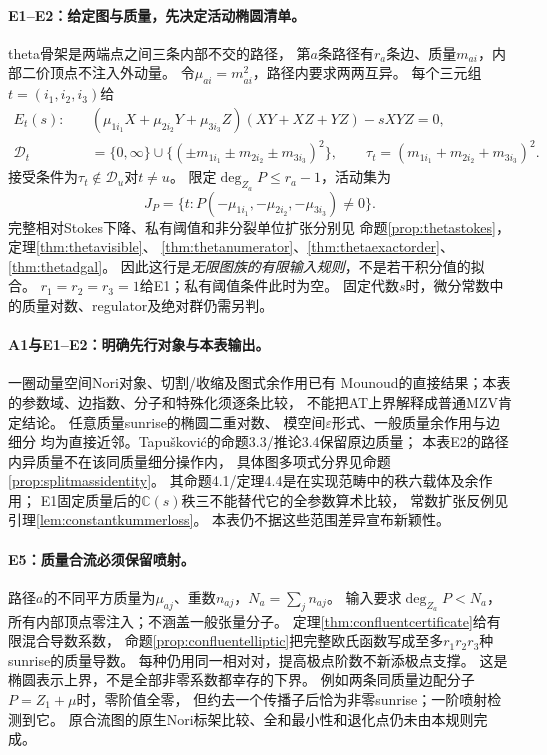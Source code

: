 \documentclass[11pt,a4paper]{ctexart}
\theoremstyle{cnplain}\newtheorem{theorem}{定理}[section]
\theoremstyle{definition}\newtheorem{definition}[theorem]{定义}
\theoremstyle{remark}\newtheorem{remark}[theorem]{注}
\begin{document}
\paragraph{E1--E2：给定图与质量，先决定活动椭圆清单。}
theta骨架是两端点之间三条内部不交的路径，
第$a$条路径有$r_a$条边、质量$m_{ai}$，内部二价顶点不注入外动量。
令$\mu_{ai}=m_{ai}^2$，路径内要求两两互异。
每个三元组$t=(i_1,i_2,i_3)$给
\begin{align*}
 E_t(s):\quad &(\mu_{1i_1}X+\mu_{2i_2}Y+\mu_{3i_3}Z)
                         (XY+XZ+YZ)-sXYZ=0,\\
 \mathcal D_t&=\{0,\infty\}\cup
   \{(\pm m_{1i_1}\pm m_{2i_2}\pm m_{3i_3})^2\},\qquad
 \tau_t=(m_{1i_1}+m_{2i_2}+m_{3i_3})^2.
\end{align*}
接受条件为$\tau_t\notin\mathcal D_u$对$t\ne u$。
限定$\deg_{Z_a}P\le r_a-1$，活动集为
\[
 J_P=\{t:P(-\mu_{1i_1},-\mu_{2i_2},-\mu_{3i_3})\ne0\}.
\]
完整相对Stokes下降、私有阈值和非分裂单位扩张分别见
命题\ref{prop:thetastokes}，定理\ref{thm:thetavisible}、
\ref{thm:thetanumerator}、\ref{thm:thetaexactorder}、\ref{thm:thetadgal}。
因此这行是\emph{无限图族的有限输入规则}，不是若干积分值的拟合。
$r_1=r_2=r_3=1$给E1；私有阈值条件此时为空。
固定代数$s$时，微分常数中的质量对数、regulator及绝对群仍需另判。


\paragraph{A1与E1--E2：明确先行对象与本表输出。}
一圈动量空间Nori对象、切割/收缩及图式余作用已有
Mounoud的直接结果\cite{LitMou}；本表的参数域、边指数、分子和特殊化须逐条比较，
不能把AT上界解释成普通MZV肯定结论。
任意质量sunrise的椭圆二重对数\cite{LitABW}、
模空间$\varepsilon$形式\cite{LitBMW}、一般质量余作用与边细分\cite{LitTap}
均为直接近邻。Tapušković的命题3.3/推论3.4保留原边质量；
本表E2的路径内异质量不在该同质量细分操作内，
具体图多项式分界见命题\ref{prop:splitmassidentity}。
其命题4.1/定理4.4是在实现范畴中的秩六载体及余作用；
E1固定质量后的$\mathbb C(s)$秩三不能替代它的全参数算术比较，
常数扩张反例见引理\ref{lem:constantkummerloss}。
本表仍不据这些范围差异宣布新颖性。

\paragraph{E5：质量合流必须保留喷射。}
路径$a$的不同平方质量为$\mu_{aj}$、重数$n_{aj}$，$N_a=\sum_j n_{aj}$。
输入要求$\deg_{Z_a}P<N_a$，所有内部顶点零注入；不涵盖一般张量分子。
定理\ref{thm:confluentcertificate}给有限混合导数系数，
命题\ref{prop:confluentelliptic}把完整欧氏函数写成至多$r_1r_2r_3$种sunrise的质量导数。
每种仍用同一相对对，提高极点阶数不新添极点支撑。
这是椭圆表示上界，不是全部非零系数都幸存的下界。
例如两条同质量边配分子$P=Z_1+\mu$时，零阶值全零，
但约去一个传播子后恰为非零sunrise；一阶喷射检测到它。
原合流图的原生Nori标架比较、全和最小性和退化点仍未由本规则完成。
\end{document}
